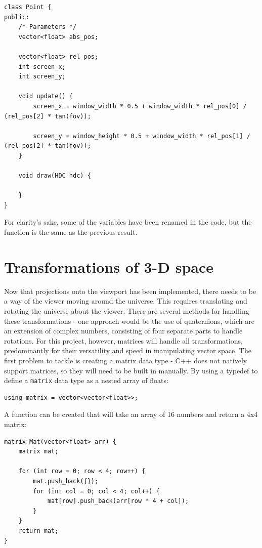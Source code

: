 \documentclass{article}
\begin{document}
\begin{lstlisting}
class Point {
public:
	/* Parameters */
	vector<float> abs_pos;
	
	vector<float> rel_pos;
	int screen_x;
	int screen_y;	
	
	void update() {
		screen_x = window_width * 0.5 + window_width * rel_pos[0] / (rel_pos[2] * tan(fov));

		screen_y = window_height * 0.5 + window_width * rel_pos[1] / (rel_pos[2] * tan(fov));
	}
	
	void draw(HDC hdc) {
	
	}
}

\end{lstlisting}
For clarity's sake, some of the variables have been renamed in the code, but the function is the same as the previous result.

\newpage

\section{Transformations of 3-D space}
Now that projections onto the viewport has been implemented, there needs to be a way of the viewer moving around the universe. This requires translating and rotating the universe about the viewer.
\newline
\newline
There are several methods for handling these transformations - one approach would be the use of quaternions, which are an extension of complex numbers, consisting of four separate parts to handle rotations. For this project, however, matrices will handle all transformations, predominantly for their versatility and speed in manipulating vector space.
\newline
\newline
The first problem to tackle is creating a matrix data type - C++ does not natively support matrices, so they will need to be built in manually. By using a typedef to define a \verb|matrix| data type as a nested array of floats:

\begin{lstlisting}
using matrix = vector<vector<float>>;
\end{lstlisting}

A function can be created that will take an array of 16 numbers and return a 4x4 matrix:
\begin{lstlisting}
matrix Mat(vector<float> arr) {
	matrix mat;

	for (int row = 0; row < 4; row++) {
		mat.push_back({});
		for (int col = 0; col < 4; col++) {
			mat[row].push_back(arr[row * 4 + col]);
		}
	}
	return mat;
}
\end{lstlisting}
\end{document}
